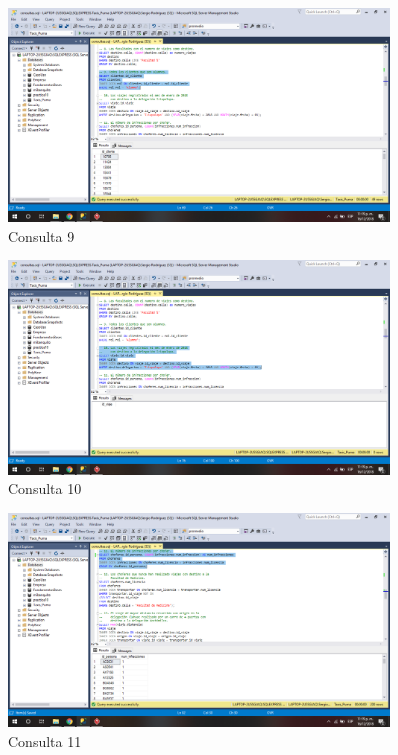 \documentclass{article}
\begin{document}
\begin{figure}[h]
            \centering
            \includegraphics[width=0.9\textwidth]{img/61.png}
            \caption{Consulta 9}
            \label{fig:my_label9}
        \end{figure}
        
\begin{figure}[h]
            \centering
            \includegraphics[width=0.9\textwidth]{img/62.png}
            \caption{Consulta 10}
            \label{fig:my_label10}
        \end{figure}
        
\begin{figure}[h]
            \centering
            \includegraphics[width=0.9\textwidth]{img/63.png}
            \caption{Consulta 11}
            \label{fig:my_label11}
        \end{figure}
        
\end{document}
